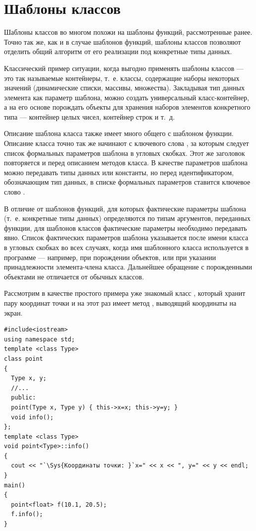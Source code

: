 \section[Шаблоны классов]{Шаблоны классов}
Шаблоны классов во многом похожи на шаблоны функций, рассмотренные ранее. Точно так же, как и в
случае шаблонов функций, шаблоны классов позволяют отделить общий алгоритм от его реализации под
конкретные типы данных. 

Классический пример ситуации, когда выгодно применять шаблоны классов --- это так называемые контейнеры, т.~е. классы,
содержащие наборы некоторых значений (динамические списки, массивы, множества). Закладывая тип данных элемента как
параметр шаблона, можно создать универсальный класс-контейнер, а на его основе порождать объекты для хранения наборов
элементов конкретного типа --- контейнер целых чисел, контейнер строк и т.~д.

Описание шаблона класса также имеет много общего с шаблоном функции. Описание класса точно так же начинают с ключевого
слова , за которым следует список формальных параметров шаблона в угловых скобках. Этот
же заголовок повторяется и перед описанием методов класса. В качестве параметров шаблона можно передавать типы данных
или константы, но перед идентификатором, обозначающим тип данных, в списке формальных параметров ставится ключевое
слово .

В отличие от шаблонов функций, для которых фактические параметры шаблона (т.~е. конкретные типы данных) определяются по
типам аргументов, переданных функции, для шаблонов классов фактические параметры необходимо передавать явно. Список
фактических параметров шаблона указывается после имени класса в угловых скобках во всех случаях, когда имя шаблонного
класса используется в программе --- например, при порождении объектов, или при указании принадлежности элемента-члена
класса. Дальнейшее обращение с порожденными объектами не отличается от обычных классов.

Рассмотрим в качестве простого примера уже знакомый класс , который хранит пару координат
точки и на этот раз имеет метод , выводящий координаты на экран.
\begin{lstlisting}
#include<iostream>
using namespace std;
template <class Type> 
class point 
{
  Type x, y;
  //...
  public:
  point(Type x, Type y) { this->x=x; this->y=y; }
  void info();
};
template <class Type>
void point<Type>::info() 
{
  cout << "`\Sys{Координаты точки: }`x=" << x << ", y=" << y << endl; 
}
main()
{
  point<float> f(10.1, 20.5);
  f.info();
}
\end{lstlisting}

